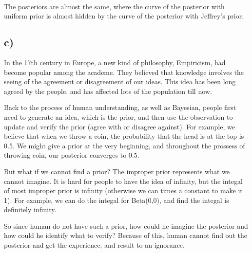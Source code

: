 \documentclass[12pt]{article}
\begin{document}
\begin{flushleft}
~\\

\qquad The posteriors are almost the same, where the curve of the posterior with uniform prior is almost hidden by the curve of the posterior with Jeffrey's prior.


\newpage

\subsection*{c)}

\qquad In the 17th century in Europe, a new kind of philosophy, Empiricism, had become popular among the academe. They believed that knowledge involves the seeing of the agreement or disagreement of our ideas.
 This idea has been long agreed by the people, and has affected lots of the population till now. 

\qquad Back to the process of human understanding, as well as Bayesian, people first need to generate an idea, which is the prior, and then use the observation to update and verify the prior (agree with or disagree against).
For example, we believe that when we throw a coin, the probability that the head is at the top is 0.5. We might give a prior at the very beginning, and throughout the prossess of throwing coin, our posterior converges to 0.5.

\qquad But what if we cannot find a prior? The improper prior represents what we cannot imagine. It is hard for people to have the idea of infinity, but the integal of most improper prior is infinity (otherwise we can times a 
constant to make it 1). For example, we can do the integal for Beta(0,0), and find the integal is definitely infinity. 

\qquad So since human do not have such a prior, how could he imagine the posterior and how could he identify what to verify? Because of this, human cannot find out the posterior and get the experience, and result to an ignorance.
\end{flushleft}
\end{document}
